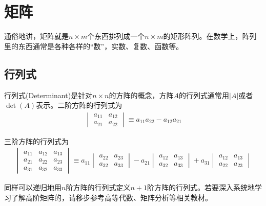 
\chapter{矩阵}
\label{chap:matrix}

通俗地讲，矩阵就是$n\times m$个东西排列成一个$n\times m$的矩形阵列。在数学上，阵列里的东西通常是各种各样的“数”，实数、复数、函数等。

\section{行列式}
\label{sec:determinant}

行列式(Determinant)是针对$n\times n$的方阵的概念，方阵$A$的行列式通常用$\left| A\right|$或者$\det(A)$表示。二阶方阵的行列式为
\begin{align*}
  \begin{vmatrix}
    a_{11} & a_{12}\\
    a_{21} & a_{22}
  \end{vmatrix}
             \equiv a_{11}a_{22} - a_{12}a_{21}
\end{align*}

三阶方阵的行列式为
\begin{align*}
  \begin{vmatrix}
    a_{11} & a_{12} & a_{13}\\
    a_{21} & a_{22} & a_{23}\\
    a_{31} & a_{32} & a_{33}
  \end{vmatrix}\equiv
   a_{11}\begin{vmatrix} a_{22} & a_{23}\\ a_{32} & a_{33} \end{vmatrix}
  -a_{21}\begin{vmatrix} a_{12} & a_{13}\\ a_{32} & a_{33} \end{vmatrix}
  +a_{31}\begin{vmatrix} a_{12} & a_{13}\\ a_{22} & a_{23} \end{vmatrix}
\end{align*}

同样可以递归地用$n$阶方阵的行列式定义$n+1$阶方阵的行列式。若要深入系统地学习了解高阶矩阵的，请移步参考高等代数、矩阵分析等相关教材。

